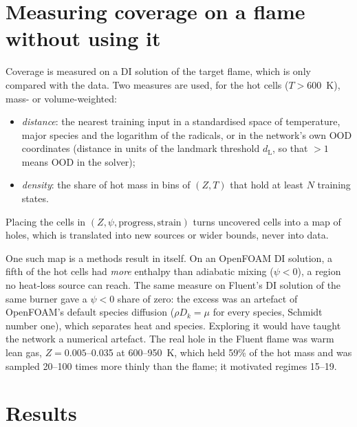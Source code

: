 \documentclass[preprint,review,12pt]{elsarticle}
\begin{document}
\section{Measuring coverage on a flame without using it}
\label{sec:coverage}
Coverage is measured on a DI solution of the target flame, which is only compared with the data. Two measures are
used, for the hot cells ($T>600$~K), mass- or volume-weighted:
\begin{itemize}
\item \emph{distance}: the nearest training input in a standardised space of temperature, major species and the
  logarithm of the radicals, or in the network's own OOD coordinates (distance in units of the landmark threshold
  $d_\mathrm{L}$, so that $>1$ means OOD in the solver);
\item \emph{density}: the share of hot mass in bins of $(Z,T)$ that hold at least $N$ training states.
\end{itemize}
Placing the cells in $(Z,\psi,\text{progress},\text{strain})$ turns uncovered cells into a map of holes, which is
translated into new sources or wider bounds, never into data.

One such map is a methods result in itself. On an OpenFOAM DI solution, a fifth of the hot cells had \emph{more}
enthalpy than adiabatic mixing ($\psi<0$), a region no heat-loss source can reach. The same measure on Fluent's DI
solution of the same burner gave a $\psi<0$ share of zero: the excess was an artefact of OpenFOAM's default species
diffusion ($\rho D_k=\mu$ for every species, Schmidt number one), which separates heat and species. Exploring it would
have taught the network a numerical artefact. The real hole in the Fluent flame was warm lean gas, $Z=0.005$--0.035
at 600--950~K, which held 59\% of the hot mass and was sampled 20--100 times more thinly than the flame; it motivated
regimes 15--19.

\section{Results}
\label{sec:results}
\end{document}
